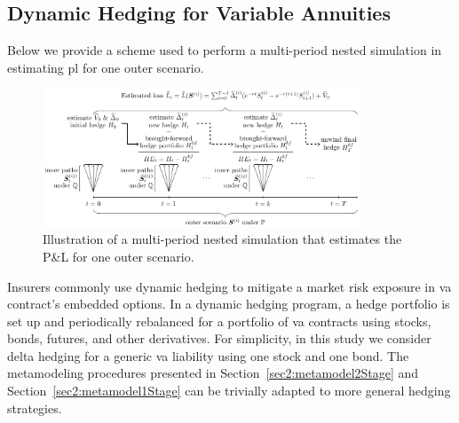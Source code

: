 \subsection{Dynamic Hedging for Variable Annuities}\label{subsec:dynamicHedge}

Below we provide a scheme used to perform a multi-period nested simulation in estimating \gls{pl} for one outer scenario.

\begin{figure}[ht]
    \centering
    \includegraphics[width=0.85\textwidth]{./project2/figures/sns.pdf}
    \caption{Illustration of a multi-period nested simulation that estimates the P\&L for one outer scenario.}
    \label{fig2:illustration}
\end{figure}

Insurers commonly use dynamic hedging to mitigate a market risk exposure in \gls{va} contract's embedded options.
In a dynamic hedging program, a hedge portfolio is set up and periodically rebalanced for a portfolio of \gls{va} contracts using stocks, bonds, futures, and other derivatives.
For simplicity, in this study we consider delta hedging for a generic \gls{va} liability using one stock and one bond.
The metamodeling procedures presented in Section~\ref{sec2:metamodel2Stage} and Section~\ref{sec2:metamodel1Stage} can be trivially adapted to more general hedging strategies.


